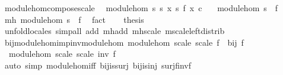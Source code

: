 \begin{isabellebody}
\ module{\isacharunderscore}{\kern0pt}hom{\isacharunderscore}{\kern0pt}compose{\isacharunderscore}{\kern0pt}scale{\isacharcolon}{\kern0pt}\isanewline
\ \ {\isachardoublequoteopen}module{\isacharunderscore}{\kern0pt}hom\ s{}\ s{}\ {\isacharparenleft}{\kern0pt}{\isasymlambda}x{\isachardot}{\kern0pt}\ s{}\ {\isacharparenleft}{\kern0pt}f\ x{\isacharparenright}{\kern0pt}\ {\isacharparenleft}{\kern0pt}c{\isacharparenright}{\kern0pt}{\isacharparenright}{\kern0pt}{\isachardoublequoteclose}\isanewline
\ \ \ {\isachardoublequoteopen}module{\isacharunderscore}{\kern0pt}hom\ s{}\ {\isacharparenleft}{\kern0pt}{\isacharasterisk}{\kern0pt}{\isacharparenright}{\kern0pt}\ f{\isachardoublequoteclose}\isanewline
%
\isadelimproof
%
\endisadelimproof
%
\isatagproof
{}\isamarkupfalse%
\ {\isacharminus}{\kern0pt}\isanewline
\ \ \isamarkupfalse%
\ mh{\isacharcolon}{\kern0pt}\ module{\isacharunderscore}{\kern0pt}hom\ s{}\ {\isachardoublequoteopen}{\isacharparenleft}{\kern0pt}{\isacharasterisk}{\kern0pt}{\isacharparenright}{\kern0pt}{\isachardoublequoteclose}\ f\ \isamarkupfalse%
\ fact\isanewline
\ \ \isamarkupfalse%
\ {\isacharquery}{\kern0pt}thesis\isanewline
\ \ \ \ \isamarkupfalse%
\ unfold{\isacharunderscore}{\kern0pt}locales\ {\isacharparenleft}{\kern0pt}simp{\isacharunderscore}{\kern0pt}all\ add{\isacharcolon}{\kern0pt}\ mh{\isachardot}{\kern0pt}add\ mh{\isachardot}{\kern0pt}scale\ m{}{\isachardot}{\kern0pt}scale{\isacharunderscore}{\kern0pt}left{\isacharunderscore}{\kern0pt}distrib{\isacharparenright}{\kern0pt}\isanewline
{}\isamarkupfalse%
%
\endisatagproof
{\isafoldproof}%
%
\isadelimproof
\isanewline
%
\endisadelimproof
\isanewline
{}\isamarkupfalse%
\ bij{\isacharunderscore}{\kern0pt}module{\isacharunderscore}{\kern0pt}hom{\isacharunderscore}{\kern0pt}imp{\isacharunderscore}{\kern0pt}inv{\isacharunderscore}{\kern0pt}module{\isacharunderscore}{\kern0pt}hom{\isacharcolon}{\kern0pt}\ {\isachardoublequoteopen}module{\isacharunderscore}{\kern0pt}hom\ scale{}\ scale{}\ f\ {\isasymLongrightarrow}\ bij\ f\ {\isasymLongrightarrow}\isanewline
\ \ module{\isacharunderscore}{\kern0pt}hom\ scale{}\ scale{}\ {\isacharparenleft}{\kern0pt}inv\ f{\isacharparenright}{\kern0pt}{\isachardoublequoteclose}\isanewline
%
\isadelimproof
\ \ %
\endisadelimproof
%
\isatagproof
{}\isamarkupfalse%
\ {\isacharparenleft}{\kern0pt}auto\ simp{\isacharcolon}{\kern0pt}\ module{\isacharunderscore}{\kern0pt}hom{\isacharunderscore}{\kern0pt}iff\ bij{\isacharunderscore}{\kern0pt}is{\isacharunderscore}{\kern0pt}surj\ bij{\isacharunderscore}{\kern0pt}is{\isacharunderscore}{\kern0pt}inj\ surj{\isacharunderscore}{\kern0pt}f{\isacharunderscore}{\kern0pt}inv{\isacharunderscore}{\kern0pt}f\isanewline

\end{isabellebody}
